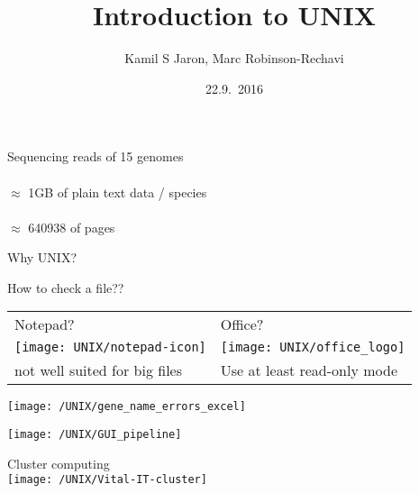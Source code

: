 \documentclass[xcolor=dvipsnames]{beamer}
\title[ ]{Introduction to UNIX}
\author{Kamil S Jaron, Marc Robinson-Rechavi}
\date{22.9.~2016}
\begin{document}
\Large
\begin{frame}
	\titlepage
\end{frame}

\begin{frame}
	\huge
	\begin{center}
	Sequencing reads of 15 genomes \\
	~\\
	$\approx$ 1GB of plain text data / species \\
	~\\
	$\approx$ 640938 of pages
	\end{center}
\end{frame}

\begin{frame}
	\Huge
	\begin{center}
		Why UNIX?	
	\end{center}
\end{frame}

\begin{frame}
	\begin{center}
	\huge
	How to check a file?? \\
	\vspace{1cm}
	
	\Large
	\begin{tabular}{C{0.4\textwidth}C{0.4\textwidth}}
	Notepad? & Office? \\
	\texttt{[image: UNIX/notepad-icon]} & \texttt{[image: UNIX/office\_logo]} \\
	\small not well suited for big files & \small Use at least read-only mode\\
	\end{tabular}
	\end{center}
\end{frame}

\begin{frame}
	\begin{center}
		\texttt{[image: /UNIX/gene\_name\_errors\_excel]}
	\end{center}
\end{frame}


\begin{frame}
	\begin{center}
		\texttt{[image: /UNIX/GUI\_pipeline]}
	\end{center}
\end{frame}


\begin{frame}
	\begin{center}
		\Huge
		Cluster computing\\
		\vspace{1cm}
		\texttt{[image: /UNIX/Vital-IT-cluster]}
	\end{center}
\end{frame}	
\end{document}

